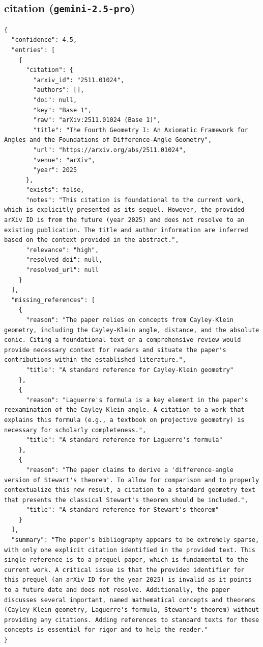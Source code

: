\documentclass[11pt]{article}
\begin{document}
\subsection*{citation (\texttt{gemini-2.5-pro})}
\begin{verbatim}
{
  "confidence": 4.5,
  "entries": [
    {
      "citation": {
        "arxiv_id": "2511.01024",
        "authors": [],
        "doi": null,
        "key": "Base 1",
        "raw": "arXiv:2511.01024 (Base 1)",
        "title": "The Fourth Geometry I: An Axiomatic Framework for Angles and the Foundations of Difference–Angle Geometry",
        "url": "https://arxiv.org/abs/2511.01024",
        "venue": "arXiv",
        "year": 2025
      },
      "exists": false,
      "notes": "This citation is foundational to the current work, which is explicitly presented as its sequel. However, the provided arXiv ID is from the future (year 2025) and does not resolve to an existing publication. The title and author information are inferred based on the context provided in the abstract.",
      "relevance": "high",
      "resolved_doi": null,
      "resolved_url": null
    }
  ],
  "missing_references": [
    {
      "reason": "The paper relies on concepts from Cayley-Klein geometry, including the Cayley-Klein angle, distance, and the absolute conic. Citing a foundational text or a comprehensive review would provide necessary context for readers and situate the paper's contributions within the established literature.",
      "title": "A standard reference for Cayley-Klein geometry"
    },
    {
      "reason": "Laguerre's formula is a key element in the paper's reexamination of the Cayley-Klein angle. A citation to a work that explains this formula (e.g., a textbook on projective geometry) is necessary for scholarly completeness.",
      "title": "A standard reference for Laguerre's formula"
    },
    {
      "reason": "The paper claims to derive a 'difference-angle version of Stewart's theorem'. To allow for comparison and to properly contextualize this new result, a citation to a standard geometry text that presents the classical Stewart's theorem should be included.",
      "title": "A standard reference for Stewart's theorem"
    }
  ],
  "summary": "The paper's bibliography appears to be extremely sparse, with only one explicit citation identified in the provided text. This single reference is to a prequel paper, which is fundamental to the current work. A critical issue is that the provided identifier for this prequel (an arXiv ID for the year 2025) is invalid as it points to a future date and does not resolve. Additionally, the paper discusses several important, named mathematical concepts and theorems (Cayley-Klein geometry, Laguerre's formula, Stewart's theorem) without providing any citations. Adding references to standard texts for these concepts is essential for rigor and to help the reader."
}
\end{verbatim}
\end{document}
